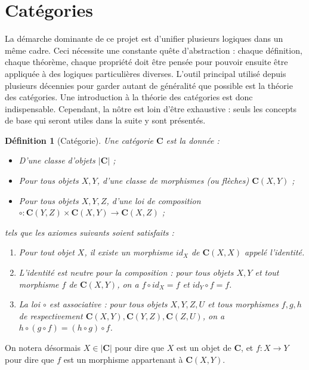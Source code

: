 \documentclass[11pt,a4paper]{article}
\newtheorem{defi}[theo]{Définition}
\newcommand{\itemz}{\item[$\triangleright$]}
\newcommand{\gr}{\textbf}
\begin{document}
\section{Catégories}
La démarche dominante de ce projet est d'unifier plusieurs logiques dans un même cadre. Ceci nécessite une constante quête d'abstraction : chaque définition, chaque théorème, chaque propriété doit être pensée pour pouvoir ensuite être appliquée à des logiques particulières diverses. L'outil principal utilisé depuis plusieurs décennies pour garder autant de généralité que possible est la théorie des catégories. Une introduction à la théorie des catégories est donc indispensable. Cependant, la nôtre est loin d'être exhaustive : seuls les concepts de base qui seront utiles dans la suite y sont présentés.
\begin{defi}[Catégorie]
Une catégorie $\gr{C}$ est la donnée :
\begin{itemize}
\setlength\itemsep{-0.3em}
\itemz D'une classe d'objets $|\gr{C}|$ ;
\itemz Pour tous objets $X,Y$, d'une classe de morphismes (ou flèches) $\gr{C}(X,Y)$ ;
\itemz Pour tous objets $X,Y,Z$, d'une loi de composition $\circ : \gr{C}(Y,Z) \times \gr{C}(X,Y) \to \gr{C}(X,Z)$ ;
\end{itemize}
tels que les axiomes suivants soient satisfaits :
\begin{enumerate}
\setlength\itemsep{-0.3em}
\item[(i)] Pour tout objet $X$, il existe un morphisme $id_X$ de $\gr{C}(X,X)$ appelé l'identité.
\item[(ii)] L'identité est neutre pour la composition : pour tous objets $X,Y$ et tout morphisme $f$ de $\gr{C}(X,Y)$, on a  $f \circ id_X = f$ et $id_Y \circ f = f$.
\item[(iii)] La loi $\circ$ est associative : pour tous objets $X,Y,Z,U$ et tous morphismes $f,g,h$ de respectivement $\gr{C}(X,Y), \gr{C}(Y,Z), \gr{C}(Z,U)$, on a $h \circ (g \circ f) = (h \circ g) \circ f$.
\end{enumerate}
\end{defi}
On notera désormais $X \in |\gr{C}|$ pour dire que $X$ est un objet de $\gr{C}$, et $f : X \to Y$ pour dire que $f$ est un morphisme appartenant à $\gr{C}(X,Y)$.\\\\
\end{document}
